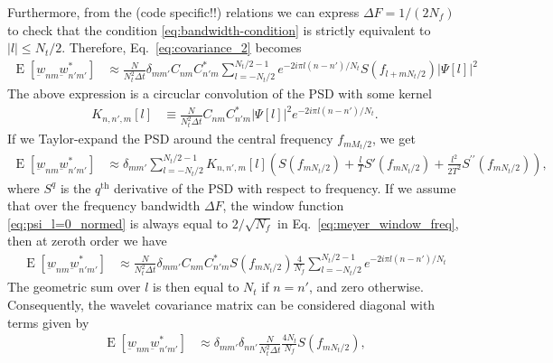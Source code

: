\documentclass{article}
\begin{document}
Furthermore, from the (code specific!!) relations we can express $\Delta F = 1 / (2 N_f)$ to check that the condition \eqref{eq:bandwidth-condition} is strictly equivalent to $|l| \leq N_t / 2$. Therefore, Eq.~\eqref{eq:covariance_2} becomes
\begin{align}
\label{eq:covariance_3}
    \operatorname{E}\left[\underbar{w}_{nm} \underbar{w}_{n'm'}^{\ast}\right] & \approx \frac{N}{N_{t}^2\Delta t} \delta_{m m'} C_{n m}  C_{n' m}^{\ast} \sum_{l=-N_t / 2}^{N_t / 2-1}   e^{-2 i \pi l (n-n') / N_t} S\left(f_{l + m N_t / 2}\right)  | \Psi[l] |^{2} 
\end{align}
The above expression is a circuclar convolution of the PSD with some kernel 
\begin{align}
    K_{n, n', m}[l] &  \equiv \frac{N}{N_{t}^2\Delta t} C_{n m}  C_{n' m}^{\ast} | \Psi[l] |^{2}  e^{-2 i \pi l (n-n') / N_t}.
\end{align}
If we Taylor-expand the PSD around the central frequency $f_{m M_t/2}$, we get
\begin{align}
\label{eq:covariance_4}
    \operatorname{E}\left[\underbar{w}_{nm} \underbar{w}_{n'm'}^{\ast}\right] & \approx \delta_{mm'} \sum_{l=-N_t / 2}^{N_t / 2-1}    K_{n, n', m}[l] \left( S\left(f_{m N_t / 2}\right) + \frac{l}{T} S'\left(f_{m N_t / 2}\right)  + \frac{l^2}{2T^2} S^{\prime\prime}\left(f_{m N_t / 2}\right) \right),
\end{align}
where $S^{q}$ is the $q^{\mathrm{th}}$ derivative of the PSD with respect to frequency. If we assume that over the frequency bandwidth $\Delta F$, the window function \eqref{eq:psi_l=0_normed} is always equal to $2/\sqrt{N_{f}}$ in Eq.~\eqref{eq:meyer_window_freq}, then at zeroth order we have
\begin{align}
\label{eq:covariance_order_0}
    \operatorname{E}\left[\underbar{w}_{nm} \underbar{w}_{n'm'}^{\ast}\right] & \approx \frac{N}{N_{t}^2\Delta t} \delta_{m m'} C_{n m}  C_{n' m}^{\ast} S\left(f_{m N_t / 2}\right)\frac{4}{N_{f}}  \sum_{l=-N_t / 2}^{N_t / 2-1}   e^{-2 i \pi l (n-n') / N_t} 
\end{align}
The geometric sum over $l$ is then equal to $N_t$ if $n = n'$, and zero otherwise. Consequently, the wavelet covariance matrix can be considered diagonal with terms given by 
\begin{align}
\label{eq:covariance_order_0_diag}
    \operatorname{E}\left[\underbar{w}_{nm} \underbar{w}_{n'm'}^{\ast}\right] & \approx \delta_{m m'} \delta_{n n'}  \frac{N}{N_{t}^2\Delta t}\frac{4N_t}{N_{f}} S\left(f_{m N_t / 2}\right) ,
\end{align}
\end{document}
